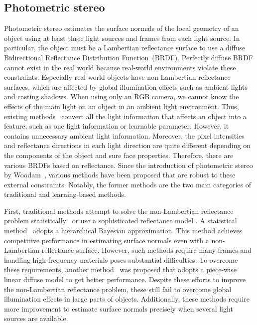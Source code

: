 \subsection{Photometric stereo}
Photometric stereo estimates the surface normals of the local geometry of an object using at least three light sources and frames from each light source. In particular, the object must be a Lambertian reflectance surface to use a diffuse Bidirectional Reflectance Distribution Function~(BRDF). 
Perfectly diffuse BRDF cannot exist in the real world because real-world environments violate these constraints. Especially real-world objects have non-Lambertian reflectance surfaces, which are affected by global illumination effects such as ambient lights and casting shadows. When using only an RGB camera, we cannot know the effects of the main light on an object in an ambient light environment. Thus, existing methods~\citep{hung2015photometric, hold2019single} convert all the light information that affects an object into a feature, such as one light information or learnable parameter. However, it contains unnecessary ambient light information. Moreover, the pixel intensities and reflectance directions in each light direction are quite different depending on the components of the object and sure
face properties. Therefore, there are various BRDFs based on reflectance. Since the introduction of photometric stereo by Woodam~\citep{woodham1980photometric}, various methods have been proposed that are robust to these external constraints. Notably, the former methods are the two main categories of traditional and learning-based methods.

First, traditional methods attempt to solve the non-Lambertian reflectance problem statistically~\citep{ikehata2012robust,ikehata2014photometric} or use a sophisticated reflectance model \citep{oren1995generalization,hertzmann2003shape,alldrin2008photometric,goldman2009shape}. A statistical method~\citep{ikehata2012robust} adopts a hierarchical Bayesian approximation. This method achieves competitive performance in estimating surface normals even with a non-Lambertian reflectance surface. However, such methods require many frames and handling high-frequency materials poses substantial difficulties. To overcome these requirements, another method~\citep{ikehata2014photometric} was proposed that adopts a piece-wise linear diffuse model to get better performance. Despite these efforts to improve the non-Lambertian reflectance problem, these still fail to overcome global illumination effects in large parts of objects. Additionally, these methods require more improvement to estimate surface normals precisely when several light sources are available.

